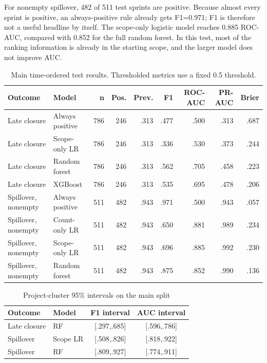 \documentclass[conference]{IEEEtran}
\begin{document}
For nonempty spillover, 482 of 511 test sprints are positive. Because almost every sprint is positive, an always-positive rule already gets F1=0.971; F1 is therefore not a useful headline by itself. The scope-only logistic model reaches 0.885 ROC-AUC, compared with 0.852 for the full random forest. In this test, most of the ranking information is already in the starting scope, and the larger model does not improve AUC.

\begin{table}[t]
\centering\scriptsize
\caption{Main time-ordered test results. Thresholded metrics use a fixed 0.5 threshold.}
\label{tab:main}
\setlength{\tabcolsep}{3.2pt}
\begin{tabular}{@{}llrrrrrrr@{}}
\toprule
Outcome & Model & n & Pos. & Prev. & F1 & ROC-AUC & PR-AUC & Brier\\
\midrule
Late closure & Always positive & 786 & 246 & .313 & .477 & .500 & .313 & .687\\
Late closure & Scope-only LR & 786 & 246 & .313 & .336 & .530 & .373 & .244\\
Late closure & Random forest & 786 & 246 & .313 & .562 & .705 & .458 & .223\\
Late closure & XGBoost & 786 & 246 & .313 & .535 & .695 & .478 & .206\\
\midrule
Spillover, nonempty & Always positive & 511 & 482 & .943 & .971 & .500 & .943 & .057\\
Spillover, nonempty & Count-only LR & 511 & 482 & .943 & .650 & .881 & .989 & .234\\
Spillover, nonempty & Scope-only LR & 511 & 482 & .943 & .696 & .885 & .992 & .230\\
Spillover, nonempty & Random forest & 511 & 482 & .943 & .875 & .852 & .990 & .136\\
\bottomrule
\end{tabular}
\end{table}

\begin{table}[!htb]
\centering\scriptsize
\caption{Project-cluster 95\% intervals on the main split}
\label{tab:cluster}
\setlength{\tabcolsep}{2.4pt}
\begin{tabular}{@{}llcc@{}}
\toprule
Outcome & Model & F1 interval & AUC interval\\
\midrule
Late closure & RF & [.297,.685] & [.596,.786]\\
Spillover & Scope LR & [.508,.826] & [.818,.922]\\
Spillover & RF & [.809,.927] & [.774,.911]\\
\bottomrule
\end{tabular}
\end{table}
\end{document}

